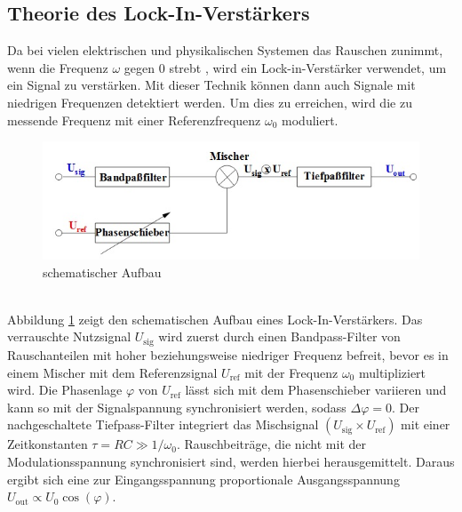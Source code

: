 \subsection{Theorie des Lock-In-Verstärkers}
Da bei vielen elektrischen und physikalischen Systemen das Rauschen zunimmt, wenn
die Frequenz $\omega$ gegen 0 strebt \cite{enet}, wird ein Lock-in-Verstärker
verwendet, um ein Signal zu verstärken. Mit dieser Technik können dann auch
Signale mit niedrigen Frequenzen detektiert werden. Um dies zu erreichen, wird die
zu messende Frequenz mit einer Referenzfrequenz $\omega_0$ moduliert. \\
\begin{figure}[h]
  \includegraphics{Bilder/Schema.jpg}
  \caption{schematischer Aufbau}
  \label{fig:schema}
\end{figure} \\
Abbildung \ref{fig:schema} zeigt den schematischen Aufbau eines Lock-In-Verstärkers.
Das verrauschte Nutzsignal $U_\text{sig}$ wird zuerst durch einen Bandpass-Filter
von Rauschanteilen mit hoher beziehungsweise niedriger Frequenz befreit, bevor
es in einem Mischer mit dem Referenzsignal $U_\text{ref}$ mit der Frequenz $\omega_0$
multipliziert wird. Die Phasenlage $\varphi$ von $U_\text{ref}$ lässt sich mit dem
Phasenschieber variieren und kann so mit der Signalspannung synchronisiert werden,
sodass $\Delta\varphi =0$.
Der nachgeschaltete Tiefpass-Filter integriert das Mischsignal $(U_\text{sig}\times U_\text{ref})$
mit einer Zeitkonstanten $\tau = RC \gg 1/\omega_0$.
Rauschbeiträge, die nicht mit der Modulationsspannung synchronisiert sind, werden
hierbei herausgemittelt. Daraus ergibt sich eine zur Eingangsspannung proportionale
Ausgangsspannung $U_\text{out} \propto U_0 \cos(\varphi)$.

